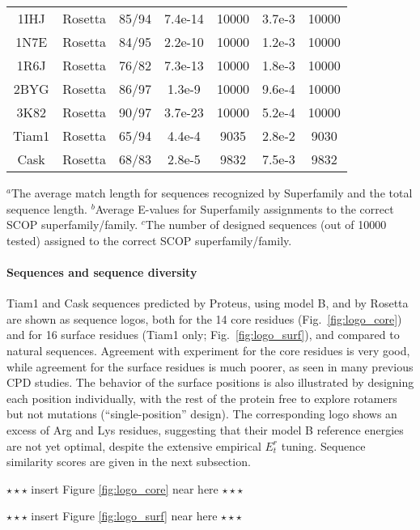 \documentclass[12pt]{article}
\begin{document}
\begin{table}[h]
\begin{center}
\begin{tabular}{ccccccc}
1IHJ    & Rosetta & 85/94 & 7.4e-14 & 10000 & 3.7e-3 & 10000 \\ 
1N7E    & Rosetta & 84/95 & 2.2e-10 & 10000 & 1.2e-3 & 10000 \\
1R6J    & Rosetta & 76/82 & 7.3e-13 & 10000 & 1.8e-3 & 10000 \\
2BYG    & Rosetta & 86/97 & 1.3e-9  & 10000 & 9.6e-4 & 10000 \\
3K82    & Rosetta & 90/97 & 3.7e-23 & 10000 & 5.2e-4 & 10000 \\ 
Tiam1   & Rosetta & 65/94 & 4.4e-4  &  9035 & 2.8e-2 &  9030 \\
Cask    & Rosetta & 68/83 & 2.8e-5  &  9832 & 7.5e-3 &  9832 \\ \hline
\end{tabular}  
\end{center} 
{\footnotesize \noindent $^a$The average match length for sequences recognized by Superfamily and the total sequence length.
$^b$Average E-values for Superfamily assignments to the correct SCOP superfamily/family.
$^c$The number of designed sequences (out of 10000 tested) assigned to the correct SCOP superfamily/family.
}
\end{table}

\clearpage

\paragraph{Sequences and sequence diversity}
Tiam1 and Cask sequences predicted by Proteus, using model B, and by Rosetta are shown as sequence logos, both for the 14 core
residues (Fig.\ \ref{fig:logo_core}) and for 16 surface residues (Tiam1 only; Fig.\ \ref{fig:logo_surf}), and compared to natural
sequences. Agreement with experiment for the core residues is very good, while agreement for the surface residues is much poorer,
as seen in many previous CPD studies. The behavior of the surface positions is also illustrated by designing each position
individually, with the rest of the protein free to explore rotamers but not mutations (``single-position'' design). The
corresponding logo shows an excess of Arg and Lys residues, suggesting that their model B reference energies are not yet optimal,
despite the extensive empirical $E^r_t$ tuning. Sequence similarity scores are given in the next subsection.
\begin{center} $\star \star \star$ insert Figure \ref{fig:logo_core} near here $\star \star \star$ \end{center}
\begin{center} $\star \star \star$ insert Figure \ref{fig:logo_surf} near here $\star \star \star$ \end{center}
\end{document}
